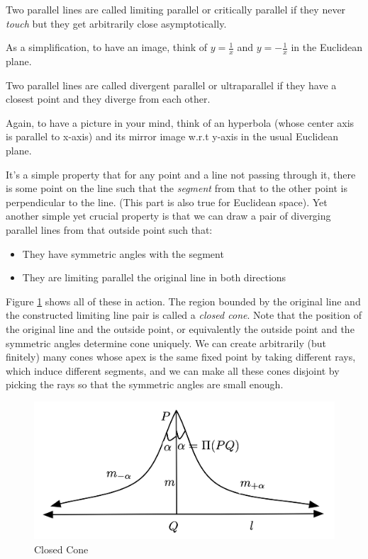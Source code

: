 \begin{definition}
Two parallel lines are called limiting parallel or critically parallel if they never \textit{touch} but they get arbitrarily close asymptotically.
\end{definition}

As a simplification, to have an image, think of $y = \frac{1}{x}$ and $y = -\frac{1}{x}$ in the Euclidean plane.

\begin{definition}
Two parallel lines are called divergent parallel or ultraparallel if they have a closest point and they diverge from each other.
\end{definition}

Again, to have a picture in your mind, think of an hyperbola (whose center axis is parallel to x-axis) and its mirror image w.r.t y-axis in the usual Euclidean plane.

It's a simple property that for any point and a line not passing through it, there is some point on the line such that the \textit{segment} from that to the other point is perpendicular to the line. (This part is also true for Euclidean space). Yet another simple yet crucial property is that we can draw a pair of diverging parallel lines from that outside point such that:

\begin{itemize}
    \item They have symmetric angles with the segment
    \item They are limiting parallel the original line in both directions
\end{itemize}

Figure \ref{fig:cone} shows all of these in action. The region bounded by the original line and the constructed limiting line pair is called a \textit{closed cone}. Note that the position of the original line and the outside point, or equivalently the outside point and the symmetric angles determine cone uniquely. We can create arbitrarily (but finitely) many cones whose apex is the same fixed point by taking different rays, which induce different segments, and we can make all these cones disjoint by picking the rays so that the symmetric angles are small enough.

\begin{figure}
    \centering
    \includegraphics[width=.7\textwidth]{chapter_14/files/cone.png}
    \caption{Closed Cone}
    \label{fig:cone}
\end{figure}

